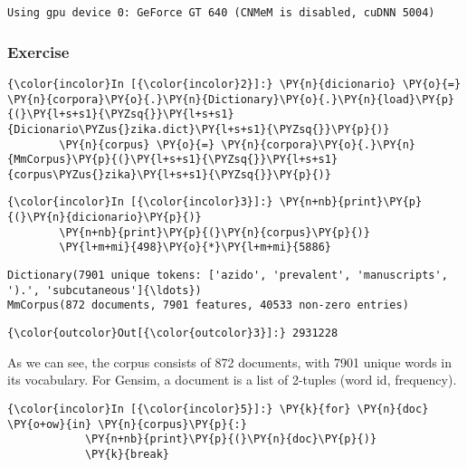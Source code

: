     \begin{Verbatim}[commandchars=\\\{\}]
Using gpu device 0: GeForce GT 640 (CNMeM is disabled, cuDNN 5004)

    \end{Verbatim}

    \subsubsection{Exercise}\label{exercise}

    \begin{Verbatim}[commandchars=\\\{\}]
{\color{incolor}In [{\color{incolor}2}]:} \PY{n}{dicionario} \PY{o}{=} \PY{n}{corpora}\PY{o}{.}\PY{n}{Dictionary}\PY{o}{.}\PY{n}{load}\PY{p}{(}\PY{l+s+s1}{\PYZsq{}}\PY{l+s+s1}{Dicionario\PYZus{}zika.dict}\PY{l+s+s1}{\PYZsq{}}\PY{p}{)}
        \PY{n}{corpus} \PY{o}{=} \PY{n}{corpora}\PY{o}{.}\PY{n}{MmCorpus}\PY{p}{(}\PY{l+s+s1}{\PYZsq{}}\PY{l+s+s1}{corpus\PYZus{}zika}\PY{l+s+s1}{\PYZsq{}}\PY{p}{)}
\end{Verbatim}

    \begin{Verbatim}[commandchars=\\\{\}]
{\color{incolor}In [{\color{incolor}3}]:} \PY{n+nb}{print}\PY{p}{(}\PY{n}{dicionario}\PY{p}{)}
        \PY{n+nb}{print}\PY{p}{(}\PY{n}{corpus}\PY{p}{)}
        \PY{l+m+mi}{498}\PY{o}{*}\PY{l+m+mi}{5886}
\end{Verbatim}

    \begin{Verbatim}[commandchars=\\\{\}]
Dictionary(7901 unique tokens: ['azido', 'prevalent', 'manuscripts', ').', 'subcutaneous']{\ldots})
MmCorpus(872 documents, 7901 features, 40533 non-zero entries)

    \end{Verbatim}

            \begin{Verbatim}[commandchars=\\\{\}]
{\color{outcolor}Out[{\color{outcolor}3}]:} 2931228
\end{Verbatim}
        
    As we can see, the corpus consists of 872 documents, with 7901 unique
words in its vocabulary. For Gensim, a document is a list of 2-tuples
(word id, frequency).

    \begin{Verbatim}[commandchars=\\\{\}]
{\color{incolor}In [{\color{incolor}5}]:} \PY{k}{for} \PY{n}{doc} \PY{o+ow}{in} \PY{n}{corpus}\PY{p}{:}
            \PY{n+nb}{print}\PY{p}{(}\PY{n}{doc}\PY{p}{)}
            \PY{k}{break}
\end{Verbatim}

